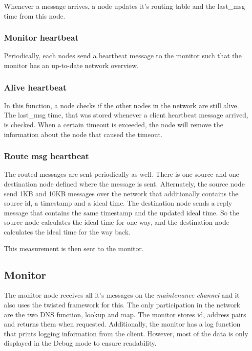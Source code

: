 \documentclass[paper=a4, fontsize=11pt]{scrartcl} %
\numberwithin{equation}{section} %
\numberwithin{figure}{section} %
\numberwithin{table}{section} %
\begin{document}
Whenever a message arrives, a node updates it's routing table and the last\_msg time from this node.

\subsubsection{Monitor heartbeat}
Periodically, each nodes send a heartbeat message to the monitor such that the monitor has an up-to-date network overview.

\subsubsection{Alive heartbeat}
In this function, a node checks if the other nodes in the network are still alive. The last\_msg time, that was stored whenever a client heartbeat message arrived, is checked. When a certain timeout is exceeded, the node will remove the information about the node that caused the timeout. 

\subsubsection{Route msg heartbeat}
The routed messages are sent periodically as well. There is one source and one destination node defined where the message is sent. Alternately, the source node send 1KB and 10KB messages over the network that additionally contains the source id, a timestamp and a ideal time. The destination node sends a reply message that contains the same timestamp and the updated ideal time. So the source node calculates the ideal time for one way, and the destination node calculates the ideal time for the way back.

This measurement is then sent to the monitor.



\subsection{Monitor}

The monitor node receives all it's messages on the \textit{maintenance channel} and it also uses the twisted framework for this. The only participation in the network are the two DNS function, lookup and map. The monitor stores id, address pairs and returns them when requested. Additionally, the monitor has a log function that prints logging information from the client. However, most of the data is only displayed in the Debug mode to ensure readability. 
\end{document}
